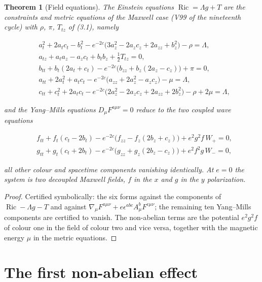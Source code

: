 \documentclass[11pt]{article}
\newtheorem{theorem}{Theorem}[section]
\theoremstyle{remark}
\begin{document}
\begin{theorem}[Field equations]
\label{thm:v20v1-equations}
The Einstein equations \(\operatorname{Ric}=\Lambda g+T\) are the
constraints and metric equations of the Maxwell case (V99 of the
nineteenth cycle) with \(\rho\), \(\pi\), \(T_{tz}\) of (3.1), namely

\[
\begin{aligned}
 &a_t^2+2a_tc_t-b_t^2-e^{-2c}\bigl(3a_z^2-2a_zc_z+2a_{zz}+b_z^2\bigr)-\rho=\Lambda,\\
 &a_{tz}+a_ta_z-a_zc_t+b_tb_z+\tfrac12T_{tz}=0,\\
 &b_{tt}+b_t(2a_t+c_t)-e^{-2c}\bigl(b_{zz}+b_z(2a_z-c_z)\bigr)+\pi=0,\\
 &a_{tt}+2a_t^2+a_tc_t-e^{-2c}\bigl(a_{zz}+2a_z^2-a_zc_z\bigr)-\mu=\Lambda,\\
 &c_{tt}+c_t^2+2a_tc_t-e^{-2c}\bigl(2a_z^2-2a_zc_z+2a_{zz}+2b_z^2\bigr)-\rho+2\mu=\Lambda,
\end{aligned}                                                          \tag{3.2}
\]

and the Yang--Mills equations \(D_\mu F^{a\mu\nu}=0\) reduce to the two
coupled wave equations

\[
\begin{aligned}
 &f_{tt}+f_t(c_t-2b_t)-e^{-2c}\bigl(f_{zz}-f_z(2b_z+c_z)\bigr)+e^2g^2f\,W_+=0,\\
 &g_{tt}+g_t(c_t+2b_t)-e^{-2c}\bigl(g_{zz}+g_z(2b_z-c_z)\bigr)+e^2f^2g\,W_-=0,
\end{aligned}                                                          \tag{3.3}
\]

all other colour and spacetime components vanishing identically.  At
\(e=0\) the system is two decoupled Maxwell fields, \(f\) in the \(x\)
and \(g\) in the \(y\) polarization.
\end{theorem}

\begin{proof}
Certified symbolically: the six forms against the components of
\(\operatorname{Ric}-\Lambda g-T\) and against
\(\nabla_\mu F^{a\mu\nu}+e\epsilon^{abc}A^b_\mu F^{c\mu\nu}\); the
remaining ten Yang--Mills components are certified to vanish.  The
non-abelian terms are the potential \(e^2g^2f\) of colour one in the
field of colour two and vice versa, together with the magnetic energy
\(\mu\) in the metric equations.
\end{proof}

\section{The first non-abelian effect}
\label{sec:v20v1-effect}
\end{document}
